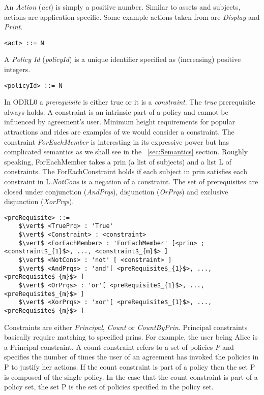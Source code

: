 An \emph{Action} (\emph{act}) is simply a positive number. Similar to assets and subjects, actions are application specific. Some example actions taken from \cite{pucella2006} are \emph{Display} and \emph{Print}.

\lstset{mathescape, language=AST}  
\begin{lstlisting}[frame=single, caption={act},label={lst:actast}]
<act> ::= N
\end{lstlisting}

A \emph{Policy Id} (\emph{policyId}) is a unique identifier specified as (increasing) positive integers. 

\lstset{mathescape, language=AST}  
\begin{lstlisting}[frame=single, caption={policyId},label={lst:policyIdast}]
<policyId> ::= N
\end{lstlisting}

In ODRL0 a \emph{prerequisite} is either true or it is a \emph{constraint}. The \emph{true} prerequisite always holds. A constraint is an intrinsic part of a policy and cannot be influenced by agreement's user. Minimum height requirements for popular attractions and rides are examples of we would consider a constraint. The constraint \emph{ForEachMember} is interesting in its expressive power but has complicated semantics as we shall see in the ~\ref{sec:Semantics} section. Roughly speaking, ForEachMember takes a prin (a list of subjects) and a list L of constraints. The ForEachConstraint holds if each subject in prin satisfies each constraint in L.\emph{NotCons} is a negation of a constraint. The set of prerequisites are closed under conjunction (\emph{AndPrqs}), disjunction (\emph{OrPrqs}) and exclusive disjunction (\emph{XorPrqs}).


\lstset{mathescape, language=AST}  
\begin{lstlisting}[frame=single, caption={preRequisite},label={lst:preRequisiteast}]
<preRequisite> ::=  
	$\vert$ <TruePrq> : 'True'
	$\vert$ <Constraint> : <constraint>	 
	$\vert$ <ForEachMember> : 'ForEachMember' [<prin> ; <constraint$_{1}$>, ..., <constraint$_{m}$> ]	
	$\vert$ <NotCons> : 'not' [ <constraint> ]
	$\vert$ <AndPrqs> : 'and'[ <preRequisite$_{1}$>, ..., <preRequisite$_{m}$> ]
	$\vert$ <OrPrqs> : 'or'[ <preRequisite$_{1}$>, ..., <preRequisite$_{m}$> ]
	$\vert$ <XorPrqs> : 'xor'[ <preRequisite$_{1}$>, ..., <preRequisite$_{m}$> ]		
\end{lstlisting}

Constraints are either \emph{Principal}, \emph{Count} or \emph{CountByPrin}. Principal constraints basically require matching to specified prins. For example, the user being Alice is a Principal constraint. A count constraint refers to a set of policies \emph{P} and specifies the number of times the user of an agreement has invoked the policies in P to justify her actions. If the count constraint is part of a policy then the set P is composed of the single policy. In the case that the count constraint is part of a policy set, the set P is the set of policies specified in the policy set.

